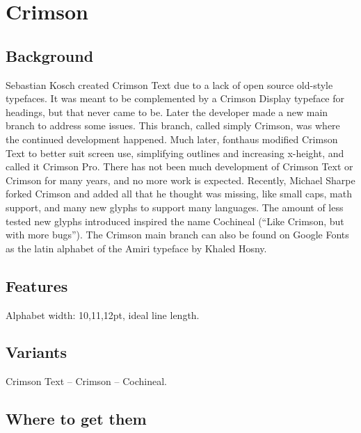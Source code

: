 \chapter{Crimson}

\section{Background}
Sebastian Kosch created Crimson Text due to a lack of open source old-style typefaces. It was meant to be complemented by a Crimson Display typeface for headings, but that never came to be. Later the developer made a new main branch to address some issues. This branch, called simply Crimson, was where the continued development happened. Much later, fonthaus modified Crimson Text to better suit screen use, simplifying outlines and increasing x-height, and called it Crimson Pro. There has not been much development of Crimson Text or Crimson for many years, and no more work is expected. Recently, Michael Sharpe forked Crimson and added all that he thought was missing, like small caps, math support, and many new glyphs to support many languages. The amount of less tested new glyphs introduced inspired the name Cochineal (“Like Crimson, but with more bugs”). The Crimson main branch can also be found on Google Fonts as the latin alphabet of the Amiri typeface by Khaled Hosny.

\section{Features}

Alphabet width: 10,11,12pt, ideal line length.

\section{Variants}
Crimson Text -- Crimson -- Cochineal.

\section{Where to get them}
